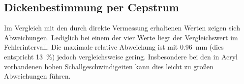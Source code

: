 \subsection{Dickenbestimmung per Cepstrum}
Im Vergleich mit den durch direkte Vermessung erhaltenen Werten zeigen sich Abweichungen.
Lediglich bei einem der vier Werte liegt der Vergleichswert im Fehlerintervall. Die maximale relative
Abweichung ist mit \SI{0.96}{\milli\metre} (dies entspricht \SI{13}{\percent}) jedoch
vergleichsweise gering. Insbesondere bei den in Acryl vorhandenen hohen Schallgeschwindigeiten
kann dies leicht zu großen Abweichungen führen.



\newpage
\nocite{*}
\printbibliography
